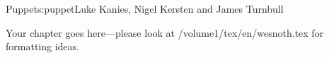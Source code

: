 \begin{aosachapter}{Puppet}{s:puppet}{Luke Kanies, Nigel Kersten and James Turnbull}

Your chapter goes here---please look at /volume1/tex/en/wesnoth.tex for 
formatting ideas.

\end{aosachapter}
